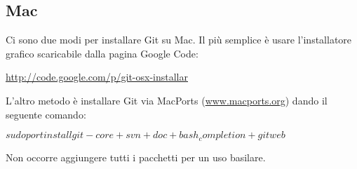 \subsection{Mac}
Ci sono due modi per installare Git su Mac. Il più semplice è usare l'installatore grafico scaricabile dalla pagina Google Code:

\url{http://code.google.com/p/git-osx-installar}

L'altro metodo è installare Git via MacPorts (\url{www.macports.org}) dando il seguente comando:

\begin{center}
\texttt{$sudo port install git-core +svn +doc +bash_completion +gitweb$}
\end{center}

Non occorre aggiungere tutti i pacchetti per un uso basilare.